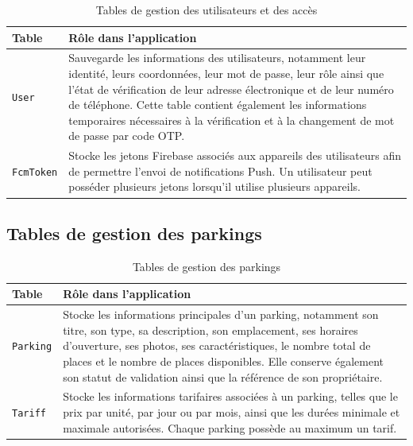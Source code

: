 \begin{table}[H]
\centering
\small
\renewcommand{\arraystretch}{1.25}
\begin{tabular}{|p{}|p{}|}
\hline
\textbf{Table} & \textbf{Rôle dans l'application} \\
\hline
\texttt{User} & Sauvegarde les informations des utilisateurs, notamment leur identité, leurs coordonnées, leur mot de passe, leur rôle ainsi que l'état de vérification de leur adresse électronique et de leur numéro de téléphone. Cette table contient également les informations temporaires nécessaires à la vérification et à la changement de mot de passe par code OTP. \\
\hline
\texttt{FcmToken} & Stocke les jetons Firebase associés aux appareils des utilisateurs afin de permettre l'envoi de notifications Push. Un utilisateur peut posséder plusieurs jetons lorsqu'il utilise plusieurs appareils. \\
\hline
\end{tabular}
\caption{Tables de gestion des utilisateurs et des accès}
\label{tab:user_access_tables}
\end{table}

\subsection{Tables de gestion des parkings}

\begin{table}[H]
\centering
\small
\renewcommand{\arraystretch}{1.25}
\begin{tabular}{|p{}|p{}|}
\hline
\textbf{Table} & \textbf{Rôle dans l'application} \\
\hline
\texttt{Parking} & Stocke les informations principales d'un parking, notamment son titre, son type, sa description, son emplacement, ses horaires d'ouverture, ses photos, ses caractéristiques, le nombre total de places et le nombre de places disponibles. Elle conserve également son statut de validation ainsi que la référence de son propriétaire. \\
\hline
\texttt{Tariff} & Stocke les informations tarifaires associées à un parking, telles que le prix par unité, par jour ou par mois, ainsi que les durées minimale et maximale autorisées. Chaque parking possède au maximum un tarif. \\
\hline
\end{tabular}
\caption{Tables de gestion des parkings}
\label{tab:parking_tables}
\end{table}

